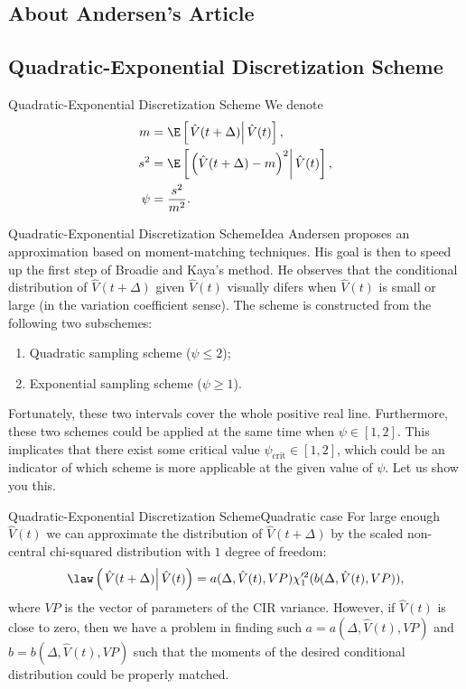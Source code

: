 \subsection{About Andersen's Article}
\subsection{Quadratic-Exponential Discretization Scheme}
    \begin{frame}{Quadratic-Exponential Discretization Scheme}{}\label{frame:Andersen:denotemeanstd}
        We denote 
        \begin{align}
            m    &= \E\left[\left.\hat{V}(t+\Delta)\right| \hat{V}(t)\right], \\
            s^2  &= \E\left[\left.\left(\hat{V}(t+\Delta) - m\right)^2\right| \hat{V}(t)\right], \\
            \psi &= \frac{s^2}{m^2}.
        \end{align}
    \end{frame}

    \begin{frame}{Quadratic-Exponential Discretization Scheme}{Idea}
        Andersen proposes an approximation based on moment-matching techniques. His goal is then to speed up the first step of Broadie and Kaya's method.
        He observes that the conditional distribution of $\hat{V}(t+\Delta)$ given $\hat{V}(t)$ visually difers when $\hat{V}(t)$ is small or large (in the variation coefficient sense).
        The scheme is constructed from the following two subschemes:
        \begin{enumerate}
            \item Quadratic sampling scheme ($\psi \leq 2$);
            \item Exponential sampling scheme ($\psi \geq 1$).
        \end{enumerate}
        Fortunately, these two intervals cover the whole positive real line. Furthermore, these two schemes could be applied at the same time when $\psi\in[1, 2]$. This implicates that there exist some critical value $\psi_{\text{crit}}\in[1, 2]$, which could be an indicator of which scheme is more applicable at the given value of $\psi$. Let us show you this.
    \end{frame}

    \begin{frame}{Quadratic-Exponential Discretization Scheme}{Quadratic case}
        For large enough $\hat{V}(t)$ we can approximate the distribution of $\hat{V}(t+\Delta)$ by the scaled non-central chi-squared distribution with $1$ degree of freedom:
        \begin{align}
            \law\left(\left.\hat{V}(t+\Delta) \right| \hat V(t)\right) =  a(\Delta, \hat{V}(t), VP) \chi'^2_1(b(\Delta, \hat{V}(t), VP)),
        \end{align}
        where $VP$ is the vector of parameters of the CIR variance.
        However, if $\hat{V}(t)$ is close to zero, then we have a problem in finding such $a = a(\Delta, \hat{V}(t), VP)$ and $b = b(\Delta, \hat{V}(t), VP)$ such that the moments of the desired conditional distribution could be properly matched.
    \end{frame}

